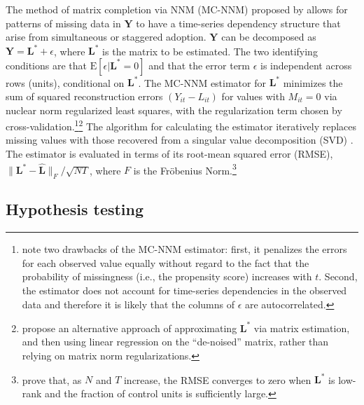 \documentclass[12pt]{article}
\newcommand{\E}{\mathrm{E}}
\begin{document}
The method of matrix completion via NNM (MC-NNM) proposed by \citet{athey2017matrix} allows for patterns of missing data in $\mathbf{Y}$ to have a time-series dependency structure that arise from simultaneous or staggered adoption. $\mathbf{Y}$ can be decomposed as $\mathbf{Y} = \mathbf{L^{*}} + \epsilon$, where $\mathbf{L^{*}}$ is the matrix to be estimated. The two identifying conditions are that $\E[\epsilon | \mathbf{L^{*}} = 0]$ and that the error term $\epsilon$ is independent across rows (units), conditional on $\mathbf{L^{*}}$. The MC-NNM estimator for $\mathbf{L^{*}}$ minimizes the sum of squared reconstruction errors $(Y_{it} - L_{it})$ for values with $M_{it} = 0$ via nuclear norm regularized least squares, with the regularization term chosen by cross-validation.\footnote{\citet{athey2017matrix} note two drawbacks of the MC-NNM estimator: first, it penalizes the errors for each observed value equally without regard to the fact that the probability of missingness (i.e., the propensity score) increases with $t$. Second, the estimator does not account for time-series dependencies in the observed data and therefore it is likely that the columns of $\epsilon$ are autocorrelated.}\footnote{\citet{amjad2018robust} propose an alternative approach of approximating $\mathbf{L^{*}}$ via matrix estimation, and then using linear regression on the ``de-noised'' matrix, rather than relying on matrix norm regularizations.} The algorithm for calculating the estimator iteratively replaces missing values with those recovered from a singular value decomposition (SVD) \citep{mazumder2010spectral}. The estimator is evaluated in terms of its root-mean squared error (RMSE), $\|\mathbf{L^{*}}-\hat{\mathbf{L}}\|_F / \sqrt{NT}$, where $F$ is the Fröbenius Norm.\footnote{\citet{athey2017matrix} prove that, as $N$ and $T$ increase, the RMSE converges to zero when $\mathbf{L^{*}}$ is low-rank and the fraction of control units is sufficiently large.}

\subsection{Hypothesis testing}
\end{document}
